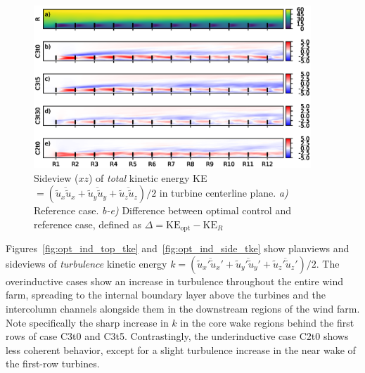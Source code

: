 	\begin{figure}[ht]
		\centering
		\includegraphics[width=0.93\textwidth]{chapters/optimal_induction_control/sideview_ke_total_side.eps}
		\caption[Sideview ($xz$) of \emph{total} kinetic energy KE $= (\overline{\widetilde{u}_x \widetilde{u}_x} + \overline{\widetilde{u}_y \widetilde{u}_y} + \overline{\widetilde{u}_z \widetilde{u}_z})/2$ in turbine centerline plane.]{Sideview ($xz$) of \emph{total} kinetic energy KE $= (\overline{\widetilde{u}_x \widetilde{u}_x} + \overline{\widetilde{u}_y \widetilde{u}_y} + \overline{\widetilde{u}_z \widetilde{u}_z})/2$ in turbine centerline plane. \emph{a) } Reference case. \emph{b-e)} Difference between optimal control and reference case, defined as $\Delta = \text{KE}_{\text{opt}} - \text{KE}_{R}$  \label{fig:opt_ind_side_total_ke}}
	\end{figure}
	
		Figures~\ref{fig:opt_ind_top_tke} and~\ref{fig:opt_ind_side_tke} show planviews and sideviews of \emph{turbulence} kinetic energy $k = (\overline{\widetilde{u}_x'\widetilde{u}_x'} + \overline{\widetilde{u}_y'\widetilde{u}_y'} + \overline{\widetilde{u}_z'\widetilde{u}_z'})/2$. The overinductive cases show an increase in turbulence throughout the entire wind farm, spreading to the internal boundary layer above the turbines and the intercolumn channels alongside them in the downstream regions of the wind farm. Note specifically the sharp increase in $k$ in the core wake regions behind the first rows of case C3t0 and C3t5. Contrastingly, the underinductive case C2t0 shows less coherent behavior, except for a slight turbulence increase in the near wake of the first-row turbines.
	
